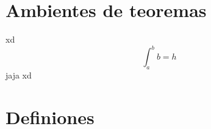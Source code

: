 \section{Ambientes de teoremas}

\begin{theorem}
    xd \lipsum[1] \[\int_a^b b = h\]
    jaja xd
\end{theorem}


\section{Definiones}

